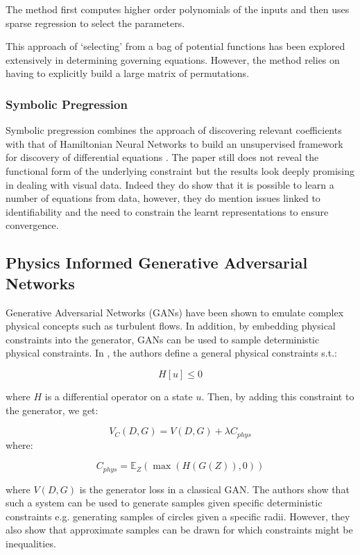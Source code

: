 \documentclass{article}
\begin{document}
The method first computes higher order polynomials of the inputs and then uses sparse regression to select the parameters. 
 
This approach of `selecting' from a bag of potential functions has been explored extensively in determining governing equations. However, the method relies on having to explicitly build a large matrix of permutations. 

\subsubsection{Symbolic Pregression}

Symbolic pregression combines the approach of discovering relevant coefficients with that of Hamiltonian Neural Networks to build an unsupervised framework for discovery of differential equations \cite{udrescu_symbolic_2020}. The paper still does not reveal the functional form of the underlying constraint but the results look deeply promising in dealing with visual data. Indeed they do show that it is possible to learn a number of equations from data, however, they do mention issues linked to identifiability and the need to constrain the learnt representations to ensure convergence.

\subsection{Physics Informed Generative Adversarial Networks}

Generative Adversarial Networks (GANs) have been shown to emulate complex physical concepts such as turbulent flows. In addition, by embedding physical constraints into the generator, GANs can be used to sample deterministic physical constraints. In \cite{yang_enforcing_2019}, the authors define a general physical constraints s.t.:

$$ H[u] \leq 0$$

where $H$ is a differential operator on a state $u$. Then, by adding this constraint to the generator, we get:

$$V_C(D,G) = V(D,G) + \lambda C_{phys} $$ where:

$$ C_{phys} = \mathbb{E}_{Z} (\max(H(G(Z)),0))$$

where $V(D,G)$ is the generator loss in a classical GAN. The authors show that such a system can be used to generate samples given specific deterministic constraints e.g. generating samples of  circles given a specific radii. However, they also show that approximate samples can be drawn for which constraints might be inequalities. 
\end{document}
